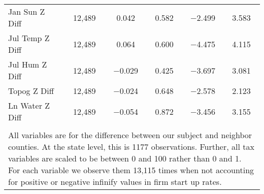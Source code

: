 \begin{table}[!htbp]
\begin{tabular}{@{\extracolsep{5pt}}lccccc}
Jan Sun Z Diff & 12,489 & 0.042 & 0.582 & $-$2.499 & 3.583 \\ 
Jul Temp Z Diff & 12,489 & 0.064 & 0.600 & $-$4.475 & 4.115 \\ 
Jul Hum Z Diff & 12,489 & $-$0.029 & 0.425 & $-$3.697 & 3.081 \\ 
Topog Z Diff & 12,489 & $-$0.024 & 0.648 & $-$2.578 & 2.123 \\ 
Ln Water Z Diff & 12,489 & $-$0.054 & 0.872 & $-$3.456 & 3.155 \\ 
\hline \\[-1.8ex] 
\multicolumn{6}{l}{All variables are for the difference between our subject and neighbor counties. At the state level, this is 1177 observations. Further, all tax variables are scaled to be between 0 and 100 rather than 0 and 1. For each variable we observe them 13,115 times when not accounting for positive or negative infinify values in firm start up rates.} \\ 
\end{tabular} 
\end{table} 

